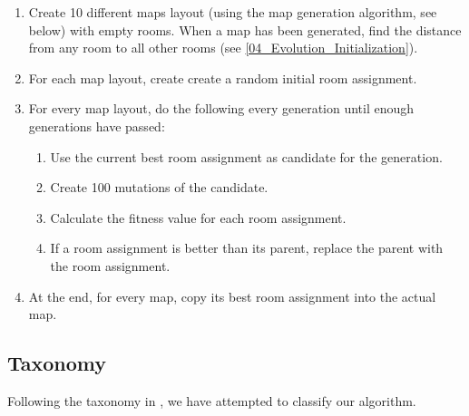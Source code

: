 \begin{enumerate}

	\item Create 10 different maps layout (using the map generation algorithm, see below) with empty rooms. When a map has been generated, find the distance from any room to all other rooms (see \ref{04_Evolution_Initialization}).

	\item For each map layout, create create a random initial room assignment.

	\item For every map layout, do the following every generation until enough generations have passed:

	\begin{enumerate}

		\item Use the current best room assignment as candidate for the generation.

		\item Create 100 mutations of the candidate.

		\item Calculate the fitness value for each room assignment.

		\item If a room assignment is better than its parent, replace the parent with the room assignment.

	\end{enumerate}

	\item At the end, for every map, copy its best room assignment into the actual map.

\end{enumerate}

\subsection{Taxonomy}
\label{04_Taxonomy}

Following the taxonomy in \cite{togelius2010search}, we have attempted to classify our algorithm.

